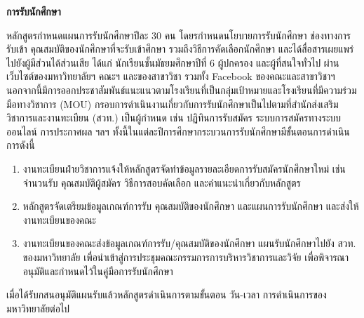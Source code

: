 \newpage
{}

\noindent
{\bf การรับนักศึกษา}

	หลักสูตรกำหนดแผนการรับนักศึกษาปีละ 30 คน โดยรกำหนดนโยบายการรับนักศึกษา ช่องทางการรับเข้า คุณสมบัติของนักศึกษาที่จะรับเข้าศึกษา รวมถึงวิธีการคัดเลือกนักศึกษา และได้สื่อสารเผยแพร่ไปยังผู้มีส่วนได้ส่วนเสีย ได้แก่ นักเรียนชั้นมัธยมศึกษาปีที่ 6 ผู้ปกครอง และผู้ที่สนใจทั่วไป ผ่านเว็บไซต์ของมหาวิทยาลัยฯ คณะฯ และของสาขาวิชา รวมทั้ง Facebook ของคณะและสาขาวิชาฯ นอกจากนี้มีการออกประชาสัมพันธ์แนะแนวตามโรงเรียนที่เป็นกลุ่มเป้าหมายและโรงเรียนที่มีความร่วมมือทางวิชาการ (MOU)   กรอบการดำเนินงานเกี่ยวกับการรับนักศึกษาเป็นไปตามที่สำนักส่งเสริมวิชาการและงานทะเบียน (สวท.) เป็นผู้กำหนด เช่น ปฏิทินการรับสมัคร ระบบการสมัครทางระบบออนไลน์ การประกาศผล ฯลฯ ทั้งนี้ในแต่ละปีการศึกษากระบวนการรับนักศึกษามีขั้นตอนการดำเนินการดังนี้
	\begin{enumerate}
		\item งานทะเบียนฝ่ายวิชาการแจ้งให้หลักสูตรจัดทำข้อมูลรายละเอียดการรับสมัครนักศึกษาใหม่ เช่น จำนวนรับ คุณสมบัติผู้สมัคร วิธีการสอบคัดเลือก และคำแนะนำเกี่ยวกับหลักสูตร
		\item หลักสูตรจัดเตรียมข้อมูลเกณฑ์การรับ คุณสมบัติของนักศึกษา และแผนการรับนักศึกษา และส่งให้งานทะเบียนของคณะ 
		\item งานทะเบียนของคณะส่งข้อมูลเกณฑ์การรับ/คุณสมบัติของนักศึกษา แผนรับนักศึกษาไปยัง สวท. ของมหาวิทยาลัย เพื่อนำเข้าสู่การประชุมคณะกรรมการการบริหารวิชาการและวิจัย เพื่อพิจารณาอนุมัติและกำหนดไว้ในคู่มือการรับนักศึกษา
	\end{enumerate}
เมื่อได้รับกสนอนุมัติแผนรับแล้วหลักสูตรดำเนินการตามขั้นตอน วัน-เวลา การดำเนินการของมหาวิทยาลัยต่อไป\\


